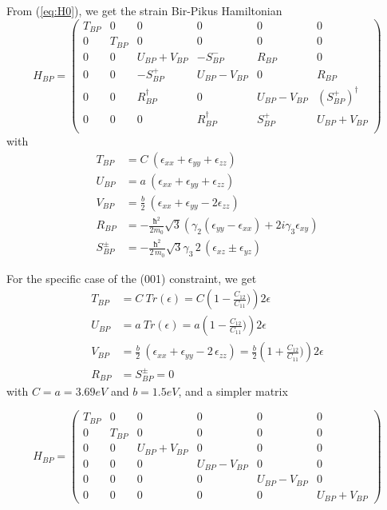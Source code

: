 \documentclass[prb,aps]{revtex4}
\begin{document}
		From (\ref{eq:H0}), we get the strain Bir-Pikus Hamiltonian 
		\begin{equation}
			\label{eq:H-BP}
			H_{BP}=
			\begin{pmatrix}
				T_{BP} & 0 & 0 &0 &0 &0     \\
				0 & T_{BP} & 0 & 0 &0 &0   \\
				0 & 0 & U_{BP}+V_{BP} & -S^-_{BP} & R_{BP} & 0  \\
				0 & 0 & - S_{BP}^+ & U_{BP}-V_{BP} & 0& R_{BP} \\
				0& 0 & R_{BP}^\dagger & 0 & U_{BP}-V_{BP} & (S_{BP}^+)^\dagger \\
				0 & 0 & 0 & R_{BP}^\dagger & S_{BP}^+ & U_{BP}+V_{BP}  \\
			\end{pmatrix}
		\end{equation}
		with  
		\begin{align}
			T_{BP} &=  C~ \left(  ϵ_{xx} + ϵ_{yy} + ϵ_{zz}  \right)  \\
			U_{BP} &= a~ \left(  ϵ_{xx} + ϵ_{yy} + ϵ_{zz}  \right)   \\
			V_{BP} &= \frac{b}{2}~ \left(  ϵ_{xx} + ϵ_{yy} -2  ϵ_{zz}  \right)  \\
			R_{BP} &= - \frac{ħ^2 }{2m_0} \sqrt{3} \left( γ_2( ϵ_{yy} - ϵ_{xx}) + 2 i γ_3  ϵ_{xy} \right) \\
			S^\pm_{BP} &= - \frac{ħ^2 }{2\,m_0} \sqrt{3} γ_3\,2\,(ϵ_{xz} \pm ϵ_{yz} )  
		\end{align}
		
		For the specific case of the (001) constraint, we get 
		\begin{align}
			T_{BP} &= C~ Tr(ϵ) = C \left( 1-\frac{C_{12}}{C_{11}}) \right) 2 ϵ  \\
			U_{BP} &= a~ Tr(ϵ) = a \left( 1-\frac{C_{12}}{C_{11}}) \right) 2 ϵ    \\
			V_{BP} &= \frac{b}{2}~ \left( ϵ_{xx} + ϵ_{yy} - 2\,ϵ_{zz} \right) = \frac{b}{2}   \left( 1+\frac{C_{12}}{C_{11}})   \right) 2 ϵ   \\
			R_{BP} &= S^\pm_{BP} =0
		\end{align}
		with $C=a=3.69 eV$ and $b=1.5 eV$, and a simpler matrix 
		
		\begin{equation}
			\label{eq:H-BP2}
			H_{BP}=
			\begin{pmatrix}
				T_{BP} & 0 & 0 &0 &0 &0     \\
				0 & T_{BP} & 0 & 0 &0 &0   \\
				0 & 0 & U_{BP}+V_{BP} & 0& 0 & 0  \\
				0 & 0 &0 & U_{BP}-V_{BP} & 0 & 0  \\
				0& 0 & 0& 0 & U_{BP}-V_{BP} &0 \\
				0 & 0 & 0 & 0 & 0 & U_{BP}+V_{BP}  
			\end{pmatrix}
		\end{equation}
\end{document}
